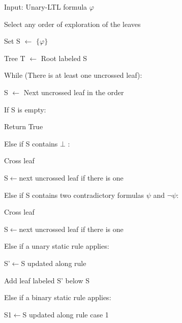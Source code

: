 \documentclass[11pt]{article}
\newcommand{\phii}{{\varphi}}
\theoremstyle{definition}
\begin{document}
{\tt 

Input: Unary-LTL formula $\phii$

Select any order of exploration of the leaves

Set S $\gets$ $\{\phii\}$

Tree T $\gets$ Root labeled S

While (There is at least one uncrossed leaf):

\hspace*{1cm} S $\gets$ Next uncrossed leaf in the order

\hspace*{1cm}   If S is empty:

\hspace*{1cm}\hspace*{1cm}    Return True

\hspace*{1cm}    Else if S contains $\bot$ :
    
\hspace*{1cm}\hspace*{1cm}        Cross leaf
        
\hspace*{1cm}\hspace*{1cm}       S$\gets$next uncrossed leaf if there is one

\hspace*{1cm}    Else if S contains two contradictory formulas $\psi$ and $\neg\psi$:

\hspace*{1cm}\hspace*{1cm}      Cross leaf
        
\hspace*{1cm}\hspace*{1cm}      S$\gets$next uncrossed leaf if there is one

\hspace*{1cm}    Else if a unary static rule applies:

\hspace*{1cm}\hspace*{1cm}      S'$\gets$S updated along rule

\hspace*{1cm}\hspace*{1cm}       Add leaf labeled S' below S

\hspace*{1cm}    Else if a binary static rule applies:

\hspace*{1cm}\hspace*{1cm}       S1$\gets$S updated along rule case 1

}
\end{document}
